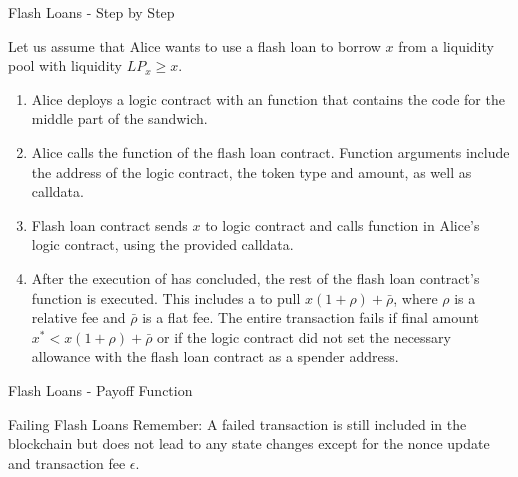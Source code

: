 \documentclass[handout]{beamer}
\begin{document}
\begin{frame}{Flash Loans - Step by Step}

\small

Let us assume that Alice wants to use a flash loan to borrow $x$ from a liquidity pool with liquidity $LP_x \geq x$. \\

\begin{enumerate}
	\item<2->[1.] Alice deploys a logic contract with an  function that contains the code for the middle part of the sandwich. %
	\item<3->[2a.] Alice calls the  function of the flash loan contract. Function arguments include the address of the logic contract, the token type and amount, as well as calldata.
	\item<4->[2b.] Flash loan contract sends $x$ to logic contract and calls  function in Alice's logic contract, using the provided calldata.
	\item<5->[2c.] After the execution of  has concluded, the rest of the flash loan contract's  function is executed. This includes a  to pull $x(1+\rho)+\bar{\rho}$, where $\rho$ is a relative fee and $\bar{\rho}$ is a flat fee. The entire transaction fails if final amount $x^* < x(1+\rho)+\bar{\rho}$ or if the logic contract did not set the necessary allowance with the flash loan contract as a spender address.
\end{enumerate}

\end{frame}


\begin{frame}{Flash Loans - Payoff Function}

\begin{keytakeaway}{Failing Flash Loans}
		Remember: A failed transaction is still included in the blockchain but does not lead to any state changes except for the nonce update and transaction fee $\epsilon$. 
\end{keytakeaway}

\vspace{0.5 em}

\small{
}

	
\end{frame}
\end{document}
